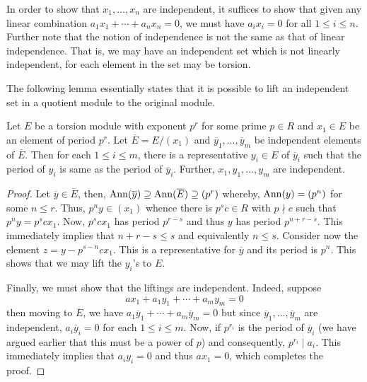 \begin{remark}
    In order to show that $x_1,\ldots,x_n$ are independent, it suffices to show that given any linear combination $a_1x_1 + \cdots + a_nx_n = 0$, we must have $a_ix_i = 0$ for all $1\le i\le n$. Further note that the notion of independence is not the same as that of linear independence. That is, we may have an independent set which is not linearly independent, for each element in the set may be torsion.
\end{remark}

The following lemma essentially states that it is possible to lift an independent set in a quotient module to the original module. 

\begin{lemma}
    Let $E$ be a torsion module with exponent $p^r$ for some prime $p\in R$ and $x_1\in E$ be an element of period $p^r$. Let $\overline E = E/(x_1)$ and $\overline y_1,\ldots,\overline y_m$ be independent elements of $\overline E$. Then for each $1\le i\le m$, there is a representative $y_i\in E$ of $\overline y_i$ such that the period of $y_i$ is same as the period of $\overline y_i$. Further, $x_1,y_1,\ldots,y_m$ are independent.
\end{lemma}
\begin{proof}
    Let $\overline y\in\overline E$, then, $\operatorname{Ann}(\overline y)\supseteq\operatorname{Ann}(\overline E)\supseteq(p^r)$ whereby, $\operatorname{Ann}(y) = (p^n)$ for some $n\le r$. Thus, $p^n y \in (x_1)$ whence there is $p^sc\in R$ with $p\nmid c$ such that $p^ny = p^sc x_1$. Now, $p^scx_1$ has period $p^{r - s}$ and thus $y$ has period $p^{n + r - s}$. This immediately implies that $n + r - s\le s$ and equivalently $n\le s$. Consider now the element $z = y - p^{s - n}cx_1$. This is a representative for $\overline y$ and its period is $p^n$. This shows that we may lift the $y_i$'s to $E$.

    Finally, we must show that the liftings are independent. Indeed, suppose 
    \begin{equation*}
        ax_1 + a_1y_1 + \cdots + a_my_m = 0
    \end{equation*}
    then moving to $\overline{E}$, we have $a_1\overline y_1 + \cdots + a_m\overline y_m = 0$ but since $\overline y_1,\ldots,\overline y_m$ are independent, $a_i\overline y_i = 0$ for each $1\le i\le m$. Now, if $p^{r_i}$ is the period of $\overline y_i$ (we have argued earlier that this must be a power of $p$) and consequently, $p^{r_i}\mid a_i$. This immediately implies that $a_iy_i = 0$ and thus $ax_1 = 0$, which completes the proof.
\end{proof}

